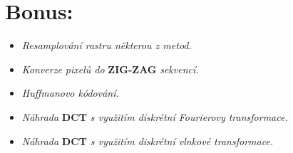 \section{Bonus:}

\begin{itemize}
    \item \textit{Resamplování rastru některou z metod.}
    \item \textit{Konverze pixelů do} \textbf{ZIG-ZAG} \textit{sekvencí.}
    \item \textit{Huffmanovo kódování.}
    \item \textit{Náhrada }\textbf{DCT}\textit{ s využitím diskrétní Fourierovy transformace.}
    \item \textit{Náhrada }\textbf{DCT}\textit{ s využitím diskrétní vlnkové transformace.}
\end{itemize}

